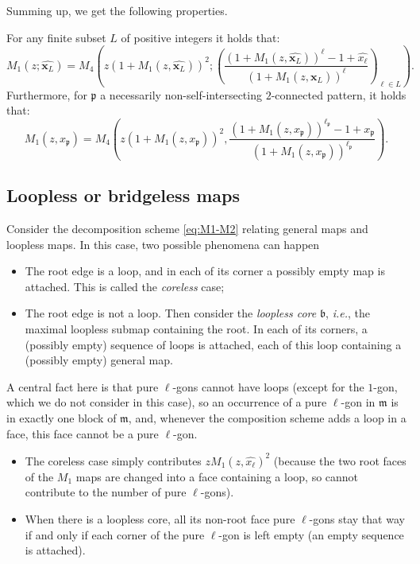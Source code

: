\documentclass[a4paper,UKenglish,cleveref, autoref, thm-restate]{lipics-v2021}
\renewcommand{\(}{\left(}
\renewcommand{\)}{\right)}
\newcommand{\nnsi}{necessarily non-self-intersecting}
\newcommand{\ellgon}{pure \texorpdfstring{$\ell$}{ell}-gon}
\newcommand{\ellgons}{\ellgon s}
\newcommand{\p}{\mathfrak{p}}
\newcommand{\m}{\mathfrak{m}}
\renewcommand{\b}{\mathfrak{b}}
\newcommand{\subfamily}{_L}
\newcommand{\xface}{x_{\ell}}
\newcommand{\x}{\mathbf{x}\subfamily}
\newcommand{\xellgon}{\widehat{\xface}}
\newcommand{\xallgons}{\widehat{\x}}
\newcommand{\xpatt}{x_{\p}}
\begin{document}
Summing up, we get the following properties.
\begin{proposition}
\label{prop:M1-M4-joint-ellgons}
For any finite subset $L$ of positive integers it holds that:
\[
{M_1}(z;\xallgons) = {M_4}\(z\(1+{M_1}(z,\xallgons)\)^2;
\left(\frac{\(1+{M_1}(z,\xallgons)\)^\ell-1 + \xellgon}{\(1+{M_1}(z,\xallgons)\)^\ell} \right)_{\ell\in L} \).
\]
Furthermore, for $\p$ a \nnsi{} $2$-connected pattern, it holds that:
\[{
M_1}(z,\xpatt) = {M_4}\(z\(1+{M_1}(z,\xpatt)\)^2,\frac{\(1+{M_1}(z,\xpatt)\)^{\ell_\p}-1 + \xpatt}{\(1+{M_1}(z,\xpatt)\)^{\ell_\p}}\).
\]
\end{proposition}

\subsection{Loopless or bridgeless maps}
\label{subsubsec:M1-M2-nnsi}
Consider the decomposition scheme \cref{eq:M1-M2} relating general maps and loopless maps. In this case, two possible phenomena can happen
\begin{itemize}
    \item The root edge is a loop, and in each of its corner a possibly empty map is attached. This is called the \emph{coreless} case;
    \item The root edge is not a loop. Then consider the \emph{loopless core} $\b$, \emph{i.e.}, the maximal loopless submap containing the root. In each of its corners, a (possibly empty) sequence of loops is attached, each of this loop containing a (possibly empty) general map.
\end{itemize}

A central fact here is that \ellgons{} cannot have loops (except for the $1$-gon, which we do not consider in this case), so an occurrence of a \ellgon{} in $\m$ is in exactly one block of $\m$, and, whenever the composition scheme adds a loop in a face, this face cannot be a \ellgon.
\begin{itemize}
    \item The coreless case simply contributes $z M_1(z,\xellgon)^2$ (because the two root faces of the $M_1$ maps are changed into a face containing a loop, so cannot contribute to the number of \ellgons{}).
    \item When there is a loopless core, all its non-root face \ellgons{} stay that way if and only if each corner of the \ellgon{} is left empty (an empty sequence is attached).
\end{itemize}
\end{document}
